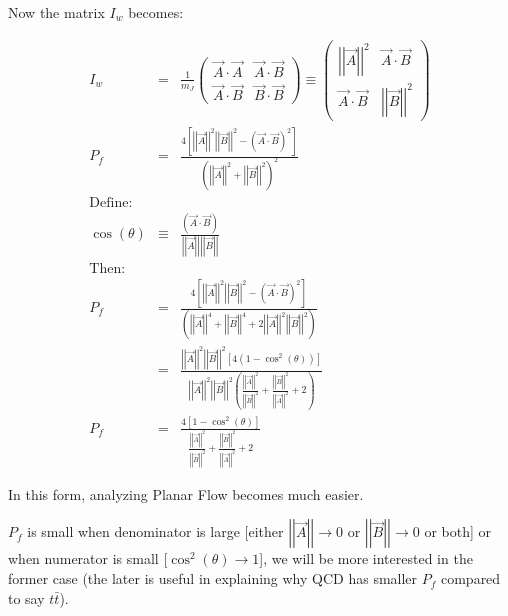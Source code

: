 Now the matrix $I_{w}$ becomes:

\begin{eqnarray*}
	I_{w} & = & \frac{1}{m_{J}}\left(\begin{array}{cc}
		\vec{A}\cdot\vec{A} & \vec{A}\cdot\vec{B}\\
		\vec{A}\cdot\vec{B} & \vec{B}\cdot\vec{B}
	\end{array}\right)\equiv\left(\begin{array}{cc}
		\left|\left|\vec{A}\right|\right|^{2} & \vec{A}\cdot\vec{B}\\
		\vec{A}\cdot\vec{B} & \left|\left|\vec{B}\right|\right|^{2}
	\end{array}\right)\\
	P_{f} & = & \frac{4\left[\left|\left|\vec{A}\right|\right|^{2}\left|\left|\vec{B}\right|\right|^{2}-\left(\vec{A}\cdot\vec{B}\right)^{2}\right]}{\left(\left|\left|\vec{A}\right|\right|^{2}+\left|\left|\vec{B}\right|\right|^{2}\right)^{2}}\\
	\text{Define:}\\
	\cos\left(\theta\right) & \equiv & \frac{\left(\vec{A}\cdot\vec{B}\right)}{\left|\left|\vec{A}\right|\right|\left|\left|\vec{B}\right|\right|}\\
	\text{Then:}\\
	P_{f} & = & \frac{4\left[\left|\left|\vec{A}\right|\right|^{2}\left|\left|\vec{B}\right|\right|^{2}-\left(\vec{A}\cdot\vec{B}\right)^{2}\right]}{\left(\left|\left|\vec{A}\right|\right|^{4}+\left|\left|\vec{B}\right|\right|^{4}+2\left|\left|\vec{A}\right|\right|^{2}\left|\left|\vec{B}\right|\right|^{2}\right)}\\
	& = & \frac{\left|\left|\vec{A}\right|\right|^{2}\left|\left|\vec{B}\right|\right|^{2}\left[4\left(1-\cos^{2}\left(\theta\right)\right)\right]}{\left|\left|\vec{A}\right|\right|^{2}\left|\left|\vec{B}\right|\right|^{2}\left(\frac{\left|\left|\vec{A}\right|\right|^{2}}{\left|\left|\vec{B}\right|\right|^{2}}+\frac{\left|\left|\vec{B}\right|\right|^{2}}{\left|\left|\vec{A}\right|\right|^{2}}+2\right)}\\
	P_{f} & = & \frac{4\left[1-\cos^{2}\left(\theta\right)\right]}{\frac{\left|\left|\vec{A}\right|\right|^{2}}{\left|\left|\vec{B}\right|\right|^{2}}+\frac{\left|\left|\vec{B}\right|\right|^{2}}{\left|\left|\vec{A}\right|\right|^{2}}+2}
\end{eqnarray*}

In this form, analyzing Planar Flow becomes much easier.

$P_{f}$ is small when denominator is large {[}either $\left|\left|\vec{A}\right|\right|\rightarrow0$ or $\left|\left|\vec{B}\right|\right|\rightarrow0$ or both{]} or when numerator is small {[}$\cos^{2}\left(\theta\right)\rightarrow1${]}, we will be more interested in the former case (the later is useful in explaining why QCD has smaller $P_{f}$ compared to say $t\bar{t}$).

